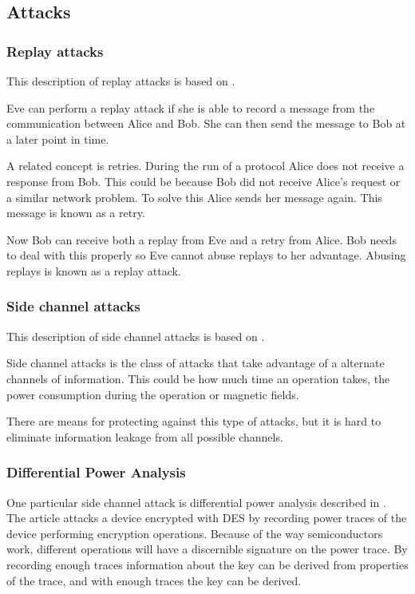 \subsection{Attacks}\label{attacks} 


\subsubsection{Replay attacks}\label{replay_attack}
This description of replay attacks is based on \citet[p.~223]{cryptoenginering}.

Eve can perform a replay attack if she is able to record a message from the communication between Alice and Bob.
She can then send the message to Bob at a later point in time. 

A related concept is retries.
During the run of a protocol Alice does not receive a response from Bob.
This could be because Bob did not receive Alice's request or a similar network problem.
To solve this Alice sends her message again.
This message is known as a retry.

Now Bob can receive both a replay from Eve and a retry from Alice.
Bob needs to deal with this properly so Eve cannot abuse replays to her advantage.
Abusing replays is known as a replay attack.


\subsubsection{Side channel attacks}
This description of side channel attacks is based on \citet[p.~132]{cryptoenginering}.

Side channel attacks is the class of attacks that take advantage of a alternate channels of information.
This could be how much time an operation takes, the power consumption during the operation or magnetic fields.

There are means for protecting against this type of attacks, but it is hard to eliminate information leakage from all possible channels.

\subsubsection{Differential Power Analysis}
One particular side channel attack is differential power analysis described in \citet{DPA}.
The article attacks a device encrypted with DES by recording power traces of the device performing encryption operations.
Because of the way semiconductors work, different operations will have a discernible signature on the power trace.
By recording enough traces information about the key can be derived from properties of the trace, and with enough traces the key can be derived.

